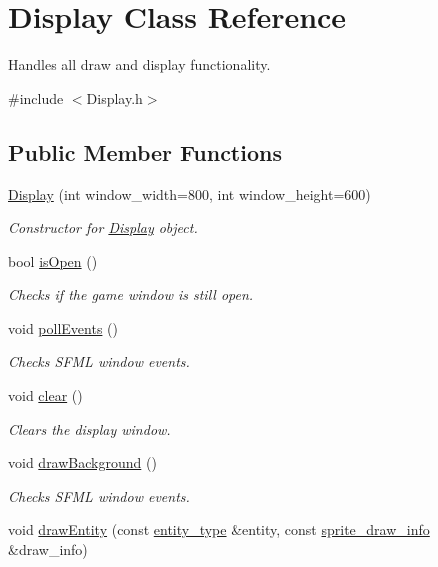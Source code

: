 \hypertarget{classDisplay}{\section{Display Class Reference}
\label{classDisplay}
}


Handles all draw and display functionality.  




{\ttfamily \#include $<$Display.\-h$>$}

\subsection*{Public Member Functions}
\begin{DoxyCompactItemize}
\item 
\hyperlink{classDisplay_a305a7d8fc20a838a73d5706820935136}{Display} (int window\-\_\-width=800, int window\-\_\-height=600)
\begin{DoxyCompactList}\small\item\em Constructor for \hyperlink{classDisplay}{Display} object. \end{DoxyCompactList}\item 
bool \hyperlink{classDisplay_abfcf2f222f42edcfa2c9b3949817ec84}{is\-Open} ()
\begin{DoxyCompactList}\small\item\em Checks if the game window is still open. \end{DoxyCompactList}\item 
void \hyperlink{classDisplay_aa56b082e14b61988f2d0d01617e0c27d}{poll\-Events} ()
\begin{DoxyCompactList}\small\item\em Checks S\-F\-M\-L window events. \end{DoxyCompactList}\item 
void \hyperlink{classDisplay_a14242933dd00fc1d50f9ae70d5121d14}{clear} ()
\begin{DoxyCompactList}\small\item\em Clears the display window. \end{DoxyCompactList}\item 
void \hyperlink{classDisplay_a2db7dc6b0ffa4851cf49f3d37095d185}{draw\-Background} ()
\begin{DoxyCompactList}\small\item\em Checks S\-F\-M\-L window events. \end{DoxyCompactList}\item 
void \hyperlink{classDisplay_a8eff4790fce1c95ad443b224c313488a}{draw\-Entity} (const \hyperlink{Structures_8h_a6d8f83e710b27d4f86c45f0bb77066e3}{entity\-\_\-type} \&entity, const \hyperlink{structsprite__draw__info}{sprite\-\_\-draw\-\_\-info} \&draw\-\_\-info)

\end{DoxyCompactItemize}
